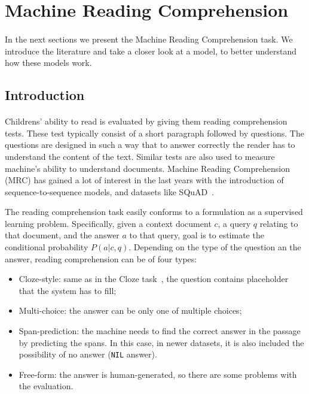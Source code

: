 \section{Machine Reading Comprehension}
\label{sec:sota_mc}
\paragraph{}
In the next sections we present the Machine Reading Comprehension task. We 
introduce the literature and take a closer look at a model, to better understand how these models work.

\subsection{Introduction}
\paragraph{}
Childrens' ability to read is evaluated by giving them reading comprehension tests. These test typically consist of a short paragraph followed by questions. The questions are designed in such a way that to answer correctly the reader has to understand the content of the text. Similar tests are also used to measure machine's ability to understand documents. Machine Reading Comprehension (MRC) has gained a lot of interest in the last years with the introduction of sequence-to-sequence models, and datasets like SQuAD~\citep{rajpurkar2016squad, rajpurkar-etal-2018-know}. 

The reading comprehension task easily conforms to a formulation as a supervised learning problem. Specifically, given a context document $c$,  a query $q$ relating to that document, and the answer $a$ to that query,  goal is to estimate the conditional probability $P(a|c, q)$. Depending on the type of the question an the answer, reading comprehension can be of four types:

\begin{itemize}[- ,noitemsep]
    \item Cloze-style: same as in the Cloze task~\citep{taylor1953cloze}, the question contains placeholder that the system has to fill;
    \item Multi-choice: the answer can be only one of multiple choices;
    \item Span-prediction: the machine needs to find the correct answer in the passage by predicting the spans. In this case, in newer datasets, it is also included the possibility of no answer (\texttt{NIL} answer).
    \item Free-form: the answer is human-generated, so there are some problems with the evaluation.
\end{itemize}

